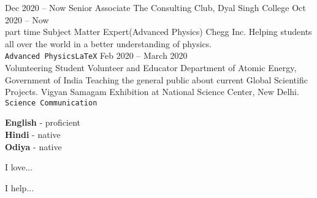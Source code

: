 \documentclass[9pt]{developercv} %
\begin{document}


\begin{entrylist}
	\entry
		{Dec 2020 -- Now}
		{Senior Associate}
		{The Consulting Club, Dyal Singh College}
	\entry
		{Oct 2020 -- Now\\\footnotesize{part time}}
		{Subject Matter Expert(Advanced Physics)}
		{Chegg Inc.}
		{Helping students all over the world in a better understanding of physics.\\ \texttt{Advanced Physics}\slashsep\texttt{LaTeX}}
	\entry
		{Feb 2020 -- March 2020\\\footnotesize{Volunteering}}
		{Student Volunteer and Educator}
		{Department of Atomic Energy, Government of India}
		{Teaching the general public about current Global Scientific Projects. Vigyan Samagam Exhibition at National Science Center, New Delhi.\\ 
		\texttt{Science Communication}}
\end{entrylist}



\begin{minipage}[t]{0.3\textwidth}
	\vspace{-\baselineskip} %

	
	\textbf{English} - proficient\\
	\textbf{Hindi} - native\\
	\textbf{Odiya} - native
\end{minipage}
\hfill
\begin{minipage}[t]{0.3\textwidth}
	\vspace{-\baselineskip} %
	
	
	I love... \lorem
\end{minipage}
\hfill
\begin{minipage}[t]{0.3\textwidth}
	\vspace{-\baselineskip} %
	
	
	I help... \lorem
\end{minipage}

\end{document}
